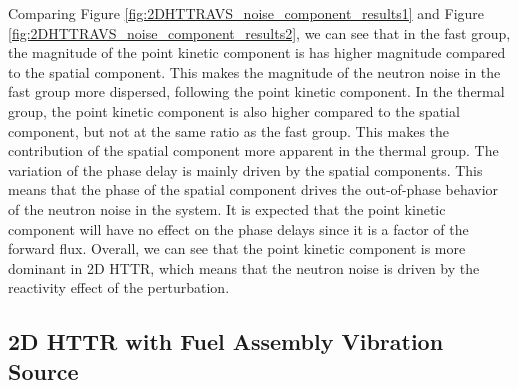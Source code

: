 Comparing Figure \ref{fig:2DHTTRAVS_noise_component_results1} and Figure \ref{fig:2DHTTRAVS_noise_component_results2}, we can see that in the fast group, the magnitude of the point kinetic component is has higher magnitude compared to the spatial component. This makes the magnitude of the neutron noise in the fast group more dispersed, following the point kinetic component. In the thermal group, the point kinetic component is also higher compared to the spatial component, but not at the same ratio as the fast group. This makes the contribution of the spatial component more apparent in the thermal group. The variation of the phase delay is mainly driven by the spatial components. This means that the phase of the spatial component drives the out-of-phase behavior of the neutron noise in the system. It is expected that the point kinetic component will have no effect on the phase delays since it is a factor of the forward flux. Overall, we can see that the point kinetic component is more dominant in 2D HTTR, which means that the neutron noise is driven by the reactivity effect of the perturbation.

\subsection{2D HTTR with Fuel Assembly Vibration Source}

